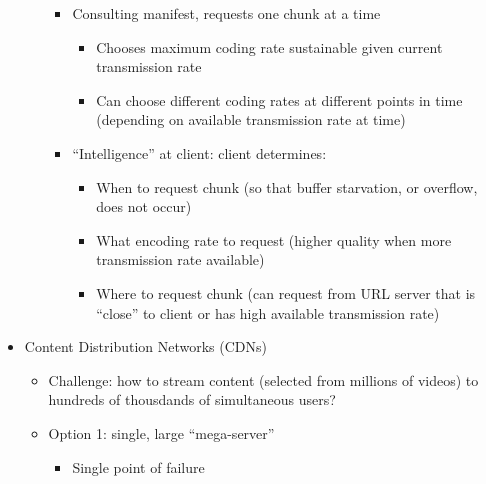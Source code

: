 \begin{itemize}
\begin{itemize}
\begin{itemize}
          \item Consulting manifest, requests one chunk at a time

            \begin{itemize}

              \item Chooses maximum coding rate sustainable given current transmission rate

              \item Can choose different coding rates at different points in time (depending on available transmission rate at time)

            \end{itemize}

          \item ``Intelligence'' at client: client determines:

            \begin{itemize}

              \item When to request chunk (so that buffer starvation, or overflow, does not occur)

              \item What encoding rate to request (higher quality when more transmission rate available)

              \item Where to request chunk (can request from URL server that is “close” to client or has high available transmission rate)

            \end{itemize}

        \end{itemize}

    \end{itemize}

  \item Content Distribution Networks (CDNs)

    \begin{itemize}

      \item Challenge: how to stream content (selected from millions of videos) to hundreds of thousdands of simultaneous users?

      \item Option 1: single, large ``mega-server''

        \begin{itemize}

          \item Single point of failure


\end{itemize}
\end{itemize}
\end{itemize}
